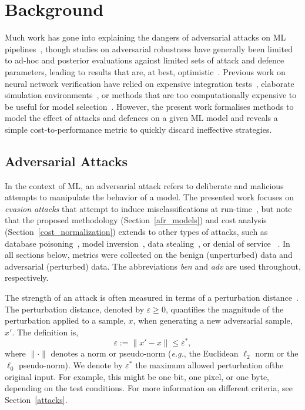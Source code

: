 \section{Background}

Much work has gone into explaining the dangers of adversarial attacks on ML pipelines~\cite{carlini_towards_2017,croce_reliable_2020,pixelattack,fgm,biggio_evasion_2013}, though studies on adversarial robustness have generally been limited to ad-hoc and posterior evaluations against limited sets of attack and defence parameters, leading to results that are, at best, optimistic~\cite{meyers,ma2020imbalanced}. Previous work on neural network verification have relied on expensive integration tests~\cite{vehicle_testing_review}, elaborate simulation environments~\cite{vehicle_formal}, or methods that are too computationally expensive to be useful for model selection~\cite{formal_adversarial}.
However, the present work formalises methods to model the effect of attacks and defences on a given ML model and reveals a simple cost-to-performance metric to quickly discard ineffective strategies.


\subsection{Adversarial Attacks}

In the context of ML, an adversarial attack refers to deliberate and malicious attempts to manipulate the behavior of a model. The presented work focuses on \textit{evasion attacks} that attempt to induce misclassifications at run-time~\cite{carlini_towards_2017,biggio_evasion_2013}, but note that the proposed methodology (Section~\ref{afr_models}) and cost analysis (Section~\ref{cost_normalization}) extends to other types of attacks, such as database poisoning~\cite{biggio_poisoning_2013,saha2020hidden}, model inversion~\cite{choquette2021label,li2021membership}, data stealing~\cite{orekondy2019knockoff}, or denial of service ~\cite{santos2021universal}. In all sections below, metrics were collected on the benign (unperturbed) data and adversarial (perturbed) data. The abbreviations \textit{ben} and \textit{adv} are used throughout, respectively.

The strength of an attack is often measured in terms of a perturbation distance~\cite{croce_reliable_2020,chakraborty_adversarial_2018,pixelattack}. The perturbation distance, denoted by $\varepsilon\geq0$, quantifies the magnitude of the perturbation applied to a sample, $x$, when generating a new adversarial sample, $x'$. The definition is,
\begin{equation}
    \varepsilon := \| x' - x \| \leq \varepsilon^*,
    \label{eq:perturbation_distance}
\end{equation}
where $\| \cdot \|$ denotes a norm or pseudo-norm (\textit{e.g.}, the Euclidean $\ell_2$ norm or the $\ell_0$ pseudo-norm). We denote by $\varepsilon^*$ the maximum allowed perturbation ofthe original input. For example, this might be one bit, one pixel, or one byte, depending on the test conditions. For more information on different criteria, see Section~\ref{attacks}.


